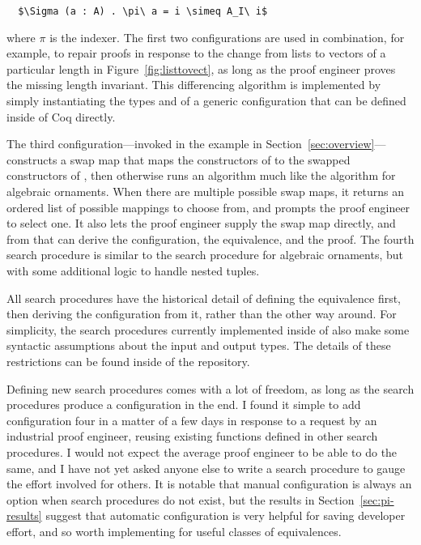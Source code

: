 \begin{lstlisting}
  $\Sigma (a : A) . \pi\ a = i \simeq A_I\ i$
\end{lstlisting}
where $\pi$ is the indexer.
The first two configurations are used in combination, for example,
to repair proofs in response to the change from lists to vectors of a particular length in Figure~\ref{fig:listtovect},
as long as the proof engineer proves the missing length invariant.
This differencing algorithm is implemented by simply instantiating the types \Aa and \B of a generic 
configuration that can be defined inside of Coq directly.

The third configuration---invoked in the example in Section~\ref{sec:overview}---constructs a swap map
that maps the constructors of \Aa to the swapped constructors of \B, then otherwise runs an algorithm much like
the algorithm for algebraic ornaments.
When there are multiple possible swap maps, it returns an ordered list of possible mappings to choose from,
and prompts the proof engineer to select one. %
It also lets the proof engineer supply the swap map directly, and from that can derive the configuration, the equivalence, and the proof.
The fourth search procedure is similar to the search procedure for algebraic ornaments, but with some additional logic
to handle nested tuples.

All search procedures have the historical detail of defining the equivalence first, then deriving the configuration from it,
rather than the other way around.
For simplicity, the search procedures currently implemented inside of \toolnamec also make some syntactic assumptions
about the input and output types.
The details of these restrictions can be found inside of the repository. %

Defining new search procedures comes with a lot of freedom, as long as the search procedures produce a configuration in the end.
I found it simple to add configuration four in a matter of a few days in response to a request by an industrial proof engineer,
reusing existing functions defined in other search procedures.
I would not expect the average proof engineer to be able to do the same, and I have not yet asked anyone else to write a search procedure
to gauge the effort involved for others.
It is notable that manual configuration is always an option when search procedures do not exist,
but the results in Section~\ref{sec:pi-results} suggest that automatic configuration is very helpful for saving developer effort,
and so worth implementing for useful classes of equivalences.

